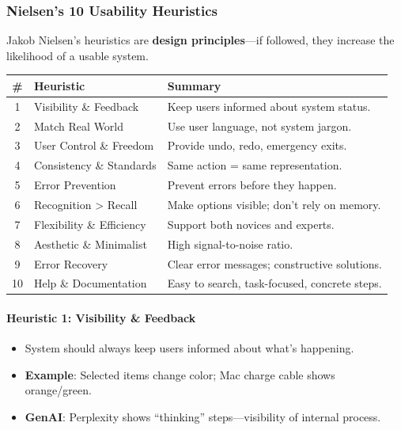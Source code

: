 \subsubsection*{Nielsen's 10 Usability Heuristics}

Jakob Nielsen's heuristics are \textbf{design principles}---if followed, they increase the likelihood of a usable system.

\begin{center}
\renewcommand{\arraystretch}{1.3}
\begin{tabular}{@{} c l p{7cm} @{}}
\toprule
\textbf{\#} & \textbf{Heuristic} & \textbf{Summary} \\
\midrule
1 & Visibility \& Feedback & Keep users informed about system status. \\
2 & Match Real World & Use user language, not system jargon. \\
3 & User Control \& Freedom & Provide undo, redo, emergency exits. \\
4 & Consistency \& Standards & Same action = same representation. \\
5 & Error Prevention & Prevent errors before they happen. \\
6 & Recognition > Recall & Make options visible; don't rely on memory. \\
7 & Flexibility \& Efficiency & Support both novices and experts. \\
8 & Aesthetic \& Minimalist & High signal-to-noise ratio. \\
9 & Error Recovery & Clear error messages; constructive solutions. \\
10 & Help \& Documentation & Easy to search, task-focused, concrete steps. \\
\bottomrule
\end{tabular}
\end{center}

\paragraph*{Heuristic 1: Visibility \& Feedback}
\begin{itemize}
  \item System should always keep users informed about what's happening.
  \item \textbf{Example}: Selected items change color; Mac charge cable shows orange/green.
  \item \textbf{GenAI}: Perplexity shows ``thinking'' steps---visibility of internal process.
\end{itemize}

